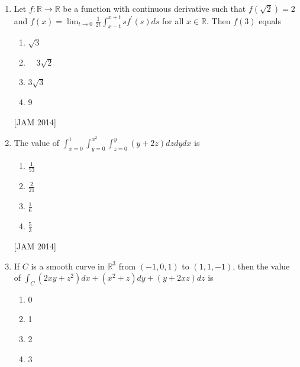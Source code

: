 \begin{enumerate}
Then $\frac{\partial f}{\partial x}(0,0)+\frac{\partial f}{\partial y}(0,0)$ equals 


\begin{enumerate}
 
\item $-1$ 
\item 0 
\item 1 
\item 2
\end{enumerate}
\hfill [JAM 2014]





 \item  Let $f: \mathbb{R} \rightarrow \mathbb{R}$ be a function with continuous derivative such that $f(\sqrt{2})=2$ and $f(x)=\lim _{t \rightarrow 0} \frac{1}{2 t} \int_{x-t}^{x+t} s f^{\prime}(s) d s$ for all $x \in \mathbb{R}$. Then $f(3)$ equals 
 

\begin{enumerate}
 \item $\sqrt{3}$ 
\item $\quad 3 \sqrt{2}$ 
\item $3 \sqrt{3}$ 
\item 9

\end{enumerate}
\hfill [JAM 2014]


\item  The value of $\int_{x=0}^{1} \int_{y=0}^{x^{2}} \int_{z=0}^{y}(y+2 z) d z d y d x$ is 


\begin{enumerate}
 
\item $\frac{1}{53}$ 
\item $\frac{2}{21}$ 
\item $\frac{1}{6}$ 
\item $\frac{5}{3}$
\end{enumerate}
\hfill [JAM 2014]


\item  If $C$ is a smooth curve in $\mathbb{R}^{3}$ from $(-1,0,1)$ to $(1,1,-1)$, then the value of $\int_{C}\left(2 x y+z^{2}\right) d x+\left(x^{2}+z\right) d y+(y+2 x z) d z$ is 

\begin{enumerate}
 \item 0 
\item 1 
\item 2 
\item 3


\end{enumerate}
\end{enumerate}
